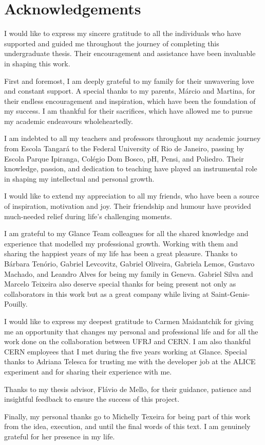 \chapter*{Acknowledgements}

I would like to express my sincere gratitude to all the individuals who have supported and guided me throughout the journey of completing this undergraduate thesis. Their encouragement and assistance have been invaluable in shaping this work.

First and foremost, I am deeply grateful to my family for their unwavering love and constant support. A special thanks to my parents, Márcio and Martina, for their endless encouragement and inspiration, which have been the foundation of my success. I am thankful for their sacrifices, which have allowed me to pursue my academic endeavours wholeheartedly.

I am indebted to all my teachers and professors throughout my academic journey from Escola Tangará to the Federal University of Rio de Janeiro, passing by Escola Parque Ipiranga, Colégio Dom Bosco, pH, Pensi, and Poliedro. Their knowledge, passion, and dedication to teaching have played an instrumental role in shaping my intellectual and personal growth.

I would like to extend my appreciation to all my friends, who have been a source of inspiration, motivation and joy. Their friendship and humour have provided much-needed relief during life's challenging moments.

I am grateful to my Glance Team colleagues for all the shared knowledge and experience that modelled my professional growth. Working with them and sharing the happiest years of my life has been a great pleasure. Thanks to Bárbara Tenório, Gabriel Levcovitz, Gabriel Oliveira, Gabriela Lemos, Gustavo Machado, and Leandro Alves for being my family in Geneva. Gabriel Silva and Marcelo Teixeira also deserve special thanks for being present not only as collaborators in this work but as a great company while living at Saint-Genis-Pouilly.

I would like to express my deepest gratitude to Carmen Maidantchik for giving me an opportunity that changes my personal and professional life and for all the work done on the collaboration between UFRJ and CERN. I am also thankful CERN employees that I met during the five years working at Glance. Special thanks to Adriana Telesca for trusting me with the developer job at the ALICE experiment and for sharing their experience with me.

Thanks to my thesis advisor, Flávio de Mello, for their guidance, patience and insightful feedback to ensure the success of this project.

Finally, my personal thanks go to Michelly Texeira for being part of this work from the idea, execution, and until the final words of this text. I am genuinely grateful for her presence in my life. 
